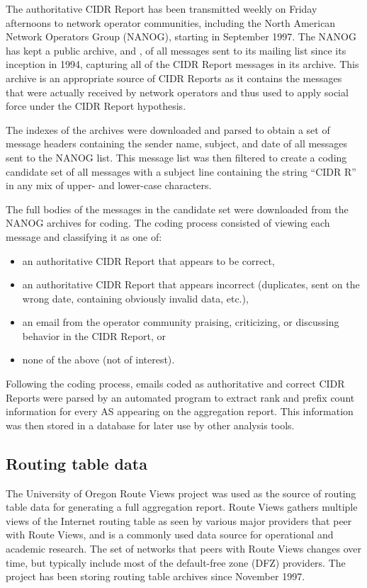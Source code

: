 The authoritative CIDR Report has been transmitted weekly on Friday afternoons
to network operator communities, including the North American Network Operators
Group (NANOG), starting in September 1997. The NANOG has kept a public archive,
\cite{NANOG} and \cite{NANOG-new}, of all messages sent to its mailing list
since its inception in 1994, capturing all of the CIDR Report messages in its
archive. This archive is an appropriate source of CIDR Reports as it contains
the messages that were actually received by network operators and thus used to
apply social force under the CIDR Report hypothesis.

The indexes of the archives were downloaded and parsed to obtain a set of
message headers containing the sender name, subject, and date of all messages
sent to the NANOG list. This message list was then filtered to create a coding
candidate set of all messages with a subject line containing the string
``CIDR R'' in any mix of upper- and lower-case characters.

The full bodies of the messages in the candidate set were downloaded from the
NANOG archives for coding. The coding process consisted of viewing each message
and classifying it as one of:

\begin{itemize}
    \item{an authoritative CIDR Report that appears to be correct,}
    \item{an authoritative CIDR Report that appears incorrect (duplicates, sent
    on the wrong date, containing obviously invalid data, etc.),}
    \item{an email from the operator community praising, criticizing, or
    discussing behavior in the CIDR Report, or}
    \item{none of the above (not of interest).}
\end{itemize}

Following the coding process, emails coded as authoritative and correct CIDR
Reports were parsed by an automated program to extract rank and prefix count
information for every AS appearing on the aggregation report. This information
was then stored in a database for later use by other analysis tools.

\subsection{Routing table data}

The University of Oregon Route Views project \cite{Routeviews} was used as the
source of routing table data for generating a full aggregation report. Route
Views gathers multiple views of the Internet routing table as seen by various
major providers that peer with Route Views, and is a commonly used data source
for operational and academic research. The set of networks that peers with
Route Views changes over time, but typically include most of the default-free
zone (DFZ) providers. The project has been storing routing table archives since
November 1997.

